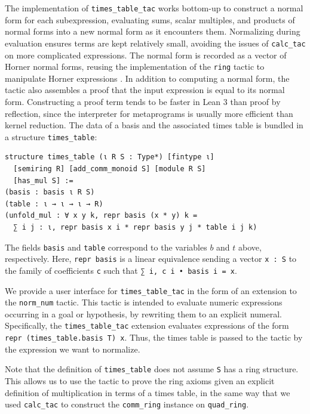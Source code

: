 \documentclass[sigplan,10pt,nonacm,
screen]{acmart} \settopmatter{printfolios=true,printccs=false,printacmref=false}
\begin{document}
The implementation of \lstinline{times_table_tac} works bottom-up to construct a normal form for each subexpression,
evaluating sums, scalar multiples, and products of normal forms into a new normal form as it encounters them.
Normalizing during evaluation ensures terms are kept relatively small, avoiding the issues of \lstinline{calc_tac} on more complicated expressions.
The normal form is recorded as a vector of Horner normal forms, reusing the implementation of the \lstinline{ring} tactic to manipulate Horner expressions \cite{ring-tactic}.
In addition to computing a normal form, the tactic also assembles a proof that the input expression is equal to its normal form.
Constructing a proof term tends to be faster in Lean 3 than proof by reflection, since the interpreter for metaprograms is usually more efficient than kernel reduction.
The data of a basis and the associated times table is bundled in a structure \lstinline{times_table}:
\begin{lstlisting}
structure times_table (ι R S : Type*) [fintype ι]
  [semiring R] [add_comm_monoid S] [module R S]
  [has_mul S] :=
(basis : basis ι R S)
(table : ι → ι → ι → R)
(unfold_mul : ∀ x y k, repr basis (x * y) k =
  ∑ i j : ι, repr basis x i * repr basis y j * table i j k)
\end{lstlisting}
The fields \lstinline{basis} and \lstinline{table} correspond to the variables $b$ and $t$ above, respectively.
Here, \lstinline{repr basis} is a linear equivalence sending a vector \lstinline{x : S} to the family of coefficients \lstinline{c}
such that \lstinline{∑ i, c i • basis i = x}.

We provide a user interface for \lstinline{times_table_tac} in the form of an extension to the \lstinline{norm_num} tactic.
This tactic is intended to evaluate numeric expressions occurring in a goal or hypothesis, by rewriting them to an explicit numeral.
Spe\-ci\-fic\-al\-ly, the \lstinline{times_table_tac} extension evaluates expressions of the form \lstinline{repr (times_table.basis T) x}.
Thus, the times table is passed to the tactic by the expression we want to normalize.

Note that the definition of \lstinline{times_table} does not assume \lstinline{S} has a ring structure.
This allows us to use the tactic to prove the ring axioms
given an explicit definition of multiplication in terms of a times table,
in the same way that we used \lstinline{calc_tac} to construct the \lstinline{comm_ring} instance on \lstinline{quad_ring}.
\end{document}
